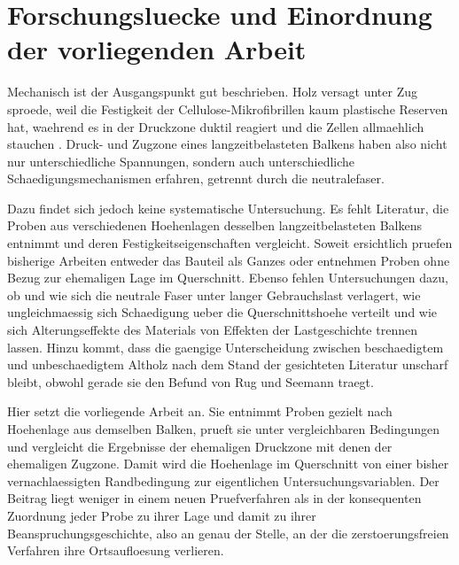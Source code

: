\section{Forschungsluecke und Einordnung der vorliegenden Arbeit}
\label{sec:lit-luecke}

Mechanisch ist der Ausgangspunkt gut beschrieben. Holz versagt unter Zug
sproede, weil die Festigkeit der Cellulose-Mikrofibrillen kaum plastische
Reserven hat, waehrend es in der Druckzone duktil reagiert und die Zellen
allmaehlich stauchen \parencite{doitpoms}. Druck- und Zugzone eines
langzeitbelasteten Balkens haben also nicht nur unterschiedliche Spannungen,
sondern auch unterschiedliche Schaedigungsmechanismen erfahren, getrennt durch
die \gls{neutralefaser}.

Dazu findet sich jedoch keine systematische Untersuchung. Es fehlt Literatur,
die Proben aus verschiedenen Hoehenlagen desselben langzeitbelasteten Balkens
entnimmt und deren Festigkeitseigenschaften vergleicht. Soweit ersichtlich
pruefen bisherige Arbeiten entweder das Bauteil als Ganzes oder entnehmen
Proben ohne Bezug zur ehemaligen Lage im Querschnitt. Ebenso fehlen
Untersuchungen dazu, ob und wie sich die neutrale Faser unter langer
Gebrauchslast verlagert, wie ungleichmaessig sich Schaedigung ueber die
Querschnittshoehe verteilt und wie sich Alterungseffekte des Materials von
Effekten der Lastgeschichte trennen lassen. Hinzu kommt, dass die gaengige
Unterscheidung zwischen beschaedigtem und unbeschaedigtem Altholz nach dem
Stand der gesichteten Literatur unscharf bleibt, obwohl gerade sie den Befund
von Rug und Seemann traegt.

Hier setzt die vorliegende Arbeit an. Sie entnimmt Proben gezielt nach
Hoehenlage aus demselben Balken, prueft sie unter vergleichbaren Bedingungen
und vergleicht die Ergebnisse der ehemaligen Druckzone mit denen der ehemaligen
Zugzone. Damit wird die Hoehenlage im Querschnitt von einer bisher
vernachlaessigten Randbedingung zur eigentlichen Untersuchungsvariablen. Der
Beitrag liegt weniger in einem neuen Pruefverfahren als in der konsequenten
Zuordnung jeder Probe zu ihrer Lage und damit zu ihrer Beanspruchungsgeschichte,
also an genau der Stelle, an der die zerstoerungsfreien Verfahren ihre
Ortsaufloesung verlieren.
